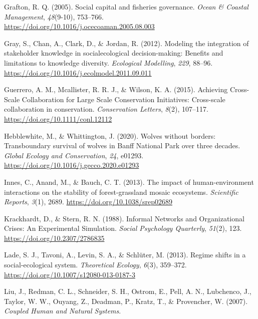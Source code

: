 \documentclass[
  12pt,
]{article}
\newlength{\cslhangindent}
\newlength{\cslentryspacingunit} %
\newenvironment{CSLReferences}[2] %
 {%
  \setlength{\parindent}{0pt}
  \ifodd #1
  \let\oldpar\par
  \def\par{\hangindent=\cslhangindent\oldpar}
  \fi
  \setlength{\parskip}{#2\cslentryspacingunit}
 }%
 {}
\begin{document}
\begin{CSLReferences}{1}{2}
\leavevmode{}%
Grafton, R. Q. (2005). Social capital and fisheries governance. \emph{Ocean \& Coastal Management}, \emph{48}(9-10), 753--766. \url{https://doi.org/10.1016/j.ocecoaman.2005.08.003}

\leavevmode{}%
Gray, S., Chan, A., Clark, D., \& Jordan, R. (2012). Modeling the integration of stakeholder knowledge in social\textendash ecological decision-making: {Benefits} and limitations to knowledge diversity. \emph{Ecological Modelling}, \emph{229}, 88--96. \url{https://doi.org/10.1016/j.ecolmodel.2011.09.011}

\leavevmode{}%
Guerrero, A. M., Mcallister, R. R. J., \& Wilson, K. A. (2015). Achieving {Cross-Scale Collaboration} for {Large Scale Conservation Initiatives}: {Cross-scale} collaboration in conservation. \emph{Conservation Letters}, \emph{8}(2), 107--117. \url{https://doi.org/10.1111/conl.12112}

\leavevmode{}%
Hebblewhite, M., \& Whittington, J. (2020). Wolves without borders: {Transboundary} survival of wolves in {Banff National Park} over three decades. \emph{Global Ecology and Conservation}, \emph{24}, e01293. \url{https://doi.org/10.1016/j.gecco.2020.e01293}

\leavevmode{}%
Innes, C., Anand, M., \& Bauch, C. T. (2013). The impact of human-environment interactions on the stability of forest-grassland mosaic ecosystems. \emph{Scientific Reports}, \emph{3}(1), 2689. \url{https://doi.org/10.1038/srep02689}

\leavevmode{}%
Krackhardt, D., \& Stern, R. N. (1988). Informal {Networks} and {Organizational Crises}: {An Experimental Simulation}. \emph{Social Psychology Quarterly}, \emph{51}(2), 123. \url{https://doi.org/10.2307/2786835}

\leavevmode{}%
Lade, S. J., Tavoni, A., Levin, S. A., \& Schlüter, M. (2013). Regime shifts in a social-ecological system. \emph{Theoretical Ecology}, \emph{6}(3), 359--372. \url{https://doi.org/10.1007/s12080-013-0187-3}

\leavevmode{}%
Liu, J., Redman, C. L., Schneider, S. H., Ostrom, E., Pell, A. N., Lubchenco, J., Taylor, W. W., Ouyang, Z., Deadman, P., Kratz, T., \& Provencher, W. (2007). \emph{Coupled {Human} and {Natural Systems}}.


\end{CSLReferences}
\end{document}
